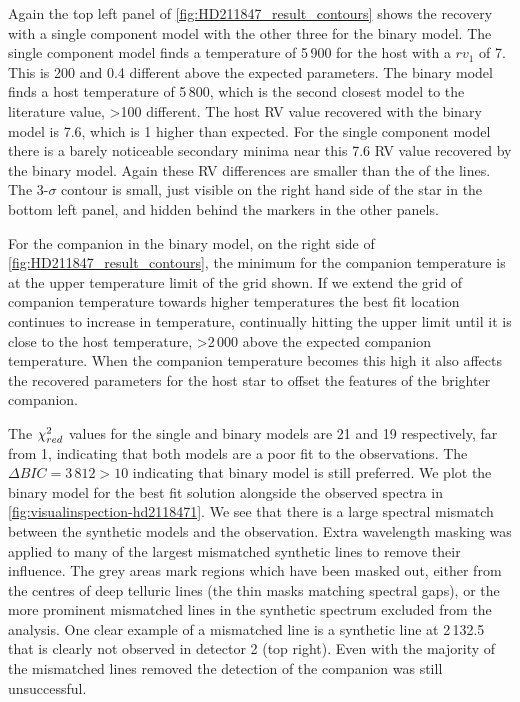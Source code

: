 Again the top left panel of \cref{fig:HD211847_result_contours} shows the recovery with a single component model with the other three for the binary model.
The single component model finds a temperature of 5\,900\K{} for the host with a \({rv}_1\) of 7\kmps{}.
This is 200\K{} and 0.4\kmps{} different above the expected parameters.
The binary model finds a host temperature of 5\,800\K{}, which is the second closest model to the literature value, >100\K{} different.
The host {RV} value recovered with the binary model is 7.6\kmps{}, which is 1\kmps{} higher than expected.  For the single component model there is a barely noticeable secondary minima near this 7.6\kmps{} {RV} value recovered by the binary model.
Again these {RV} differences are smaller than the {\fwhm} of the lines.
The 3-\(\sigma\) contour is small, just visible on the right hand side of the star in the bottom left panel, and hidden behind the markers in the other panels.


For the companion in the binary model, on the right side of \cref{fig:HD211847_result_contours}, the minimum \textchisquared{} for the companion temperature is at the upper temperature limit of the grid shown.
If we extend the grid of companion temperature towards higher temperatures the best fit location continues to increase in temperature, continually hitting the upper limit until it is close to the host temperature, >2\,000\K{} above the expected companion temperature.
When the companion temperature becomes this high it also affects the recovered parameters for the host star to offset the features of the brighter companion.

The \({\chi}^{2}_{red}\) values for the single and binary models are 21 and 19 respectively, far from 1, indicating that both models are a poor fit to the observations. {\red{} The $\Delta {BIC} = 3\,812 >10$ indicating that binary model is still preferred.} We plot the binary model for the best fit solution alongside the observed spectra in \cref{fig:visualinspection-hd2118471}.
We see that there is a large spectral mismatch between the synthetic models and the observation.
Extra wavelength masking was applied to many of the largest mismatched synthetic lines to remove their influence.
The grey areas mark regions which have been masked out, either from the centres of deep telluric lines (the thin masks matching spectral gaps), or the more prominent mismatched lines in the synthetic spectrum excluded from the \textchisquared{} analysis.
One clear example of a mismatched line is a synthetic line at 2\,132.5\nm{} that is clearly not observed in detector 2 (top right).
Even with the majority of the mismatched lines removed the detection of the companion was still unsuccessful.

